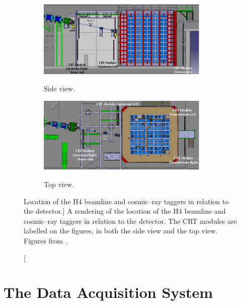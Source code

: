 \begin{figure}

	\centering

	\begin{subfigure}[b]{\textwidth}
		\centering
		\includegraphics[width=0.9\textwidth]{figures/crt_side.pdf}
		\label{fig:crt_side}
		\caption{Side view.}
	\end{subfigure}

	\vspace{3mm}

	\begin{subfigure}[b]{\textwidth}
		\centering
		\includegraphics[width=0.9\textwidth]{figures/crt_top.pdf}
		\label{fig:crt_top}
		\caption{Top view.}
	\end{subfigure}

	\caption
	[Location of the H4 beamline and cosmic--ray taggers in relation to the
	\protodune{} detector.]
	{A rendering of the location of the H4 beamline and cosmic--ray taggers in 
	relation to the \protodune{} detector. The CRT modules are labelled on the
	figures, in both the side view and the top view. Figures from 
	\cite{protoduneperf}.}

	\label{fig:pdsp_CRT}

\end{figure}

\section{The Data Acquisition System} \label{sec:pdsp_daq}


